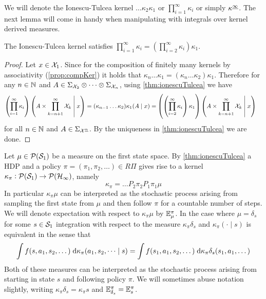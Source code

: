 We will denote the Ionescu-Tulcea kernel $\dots \kappa_2 \kappa_1$ or
$\prod_{i=1}^\infty \kappa_i$ or simply $\kappa^{\underline{\infty}}$.
The next lemma will come in handy when manipulating with integrals over
kernel derived measures.

\begin{lem}
  The Ionescu-Tulcea kernel satisfies
  $\prod_{i=1}^\infty \kappa_i = (\prod_{i=2}^\infty \kappa_i) \kappa_1$.
  \label{lem:ionescu}
\end{lem}
\begin{proof}
  Let $x \in \mathcal{X}_1$.
  Since for the composition of finitely many
  kernels by associativity (\cref{prop:compKer}) it holds that
  $\kappa_n \dots \kappa_1
  = (\kappa_n \dots \kappa_2) \kappa_1$.
  Therefore for any $n \in \mathbb{N}$ and $A \in \Sigma_{\mathcal{X}_2} \otimes
  \dots \otimes \Sigma_{\mathcal{X}_n}$, using \cref{thm:ionescuTulcea} we have
  \begin{align*}
    \left( \prod_{i=1}^\infty \kappa_i \right)
    \left( A \times \prod_{k=n+1}^\infty \mathcal{X}_k \;\middle\vert\; x \right)
    = (\kappa_{n-1} \dots \kappa_2) \kappa_1 (A \mid x)
    &= \left( \left( \prod_{i=2}^\infty \kappa_i \right) \kappa_1 \right)
    \left( A \times \prod_{k=n+1}^\infty \mathcal{X}_k \;\middle\vert\; x \right)
  \end{align*}
  for all $n \in \mathbb{N}$ and $A \in \Sigma_{\mathcal{X}^{\underline{n}}}$.
  By the uniqueness in \cref{thm:ionescuTulcea} we are done.
\end{proof}

Let $\mu \in \mathcal{P}(\mathcal{S}_1)$ be a measure on the first state space.
By \cref{thm:ionescuTulcea} a HDP and a policy
$\pi = (\pi_1, \pi_2, \dots) \in R\Pi$ gives rise to
a kernel $\kappa_\pi : \mathcal{P}(\mathcal{S}_1) \to \mathcal{P}(\mathcal{H}_\infty)$, namely
\begin{equation}
  \kappa_\pi = \dots P_2 \pi_2 P_1 \pi_1 \mu
  \label{eq:kappaPi}
\end{equation}
In particular $\kappa_\pi \mu$ can be interpreted as the stochastic process
arising from sampling the first state from $\mu$ and then follow $\pi$
for a countable number of steps.
We will denote expectation with respect to $\kappa_\pi \mu$ by
$\mathbb{E}_{\mu}^\pi$. 
In the case where $\mu = \delta_{s}$ for some $s \in \mathcal{S}_1$
integration with respect to the measure $\kappa_\pi \delta_s$
and $\kappa_\pi(\cdot \mid s)$ is equivalent in the sense that
\[ \int f(s, a_1, s_2, \dots) \; \mathrm{d} \kappa_\pi(a_1, s_2, \dots \mid s)
= \int f(s_1, a_1, s_2, \dots) \; \mathrm{d} \kappa_\pi \delta_s(s_1, a_1, \dots) \]
Both of these measures can be interpreted as the stochastic process
arising from starting in state $s$ and following policy $\pi$.
We will sometimes abuse notation slightly, writing
$\kappa_\pi \delta_s = \kappa_\pi s$ and $\mathbb{E}_{\delta_s}^\pi = \mathbb{E}_s^\pi$.

